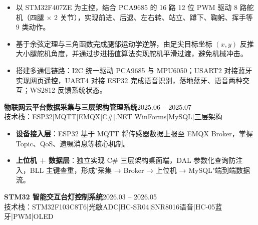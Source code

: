 \documentclass[10pt,a4paper]{article}
\newcommand{\projectblock}[3]{%
    {\bfseries\color{darktext}#1}\hfill{\color{graytext}#2}\\%
    {\small\color{graytext}#3}%
    \vspace{0.2em}%
}
\begin{document}
\begin{itemize}[leftmargin=1.5em, itemsep=2pt, parsep=0pt, topsep=2pt]
    \item 以 STM32F407ZE 为主控，结合 PCA9685 的 16 路 12 位 PWM 驱动 8 路舵机（四腿 $\times$ 2 关节），实现前进、后退、左右转、站立、蹲下、鞠躬、挥手等 9 类动作。
    \item 基于余弦定理与三角函数完成腿部运动学逆解，由足尖目标坐标 $(x, y)$ 反推大小腿舵机角度，并通过步进插值算法实现舵机平滑过渡，避免机械冲击。
    \item 搭建多通信链路：I2C 统一驱动 PCA9685 与 MPU6050；USART2 对接蓝牙实现网页遥控，UART4 对接 ESP32 完成语音识别，落地蓝牙、语音两种交互；WS2812 反馈系统状态。
\end{itemize}

\vspace{0.15em}

\projectblock{物联网云平台数据采集与三层架构管理系统}{2025.06 -- 2025.07}{技术栈：ESP32\hspace{0.3em}|\hspace{0.3em}MQTT\hspace{0.3em}|\hspace{0.3em}EMQX\hspace{0.3em}|\hspace{0.3em}C\#\hspace{0.3em}|\hspace{0.3em}.NET WinForms\hspace{0.3em}|\hspace{0.3em}MySQL\hspace{0.3em}|\hspace{0.3em}三层架构}

\begin{itemize}[leftmargin=1.5em, itemsep=2pt, parsep=0pt, topsep=2pt]
    \item \textbf{设备接入层}：ESP32 基于 MQTT 将传感器数据上报至 EMQX Broker，掌握 Topic、QoS、遗嘱消息等核心机制。
    \item \textbf{上位机 + 数据层}：独立实现 C\# 三层架构桌面端，DAL 参数化查询防注入，BLL 主键查重，形成"采集 → Broker → 上位机 → MySQL"端到端数据流。
\end{itemize}

\vspace{0.15em}

\projectblock{STM32 智能交互台灯控制系统}{2026.03 -- 2026.05}{技术栈：STM32F103C8T6\hspace{0.3em}|\hspace{0.3em}光敏ADC\hspace{0.3em}|\hspace{0.3em}HC-SR04\hspace{0.3em}|\hspace{0.3em}SNR8016语音\hspace{0.3em}|\hspace{0.3em}HC-05蓝牙\hspace{0.3em}|\hspace{0.3em}PWM\hspace{0.3em}|\hspace{0.3em}OLED}
\end{document}

